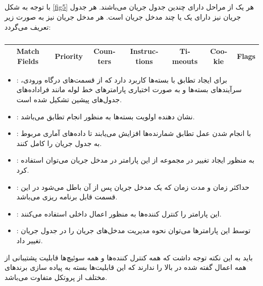 \subsection{}
با توجه به شکل \ref{fig5} هر یک از مراحل  دارای چندین جدول جریان می‌باشند. هر جدول جریان نیز دارای یک یا چند مدخل جریان است. هر مدخل جریان نیز به صورت زیر تعریف می‌گردد:
\begin{table}[ht]
	\centering
	\begin{latin}
		\begin{tabular}[t]{|c|c|c|c|c|c|c|}
			\hline
			Match Fields & Priority & Counters & Instructions & Timeouts & Cookie & Flags\\
			\hline
		\end{tabular}
	\end{latin}
	\caption{}
	\label{tab1}
\end{table}

\begin{itemize}
	\item {}:
برای ایجاد تطابق با بسته‌ها کاربرد دارد که از قسمت‌های درگاه ورودی، سرآیند‌های بسته‌ها و به صورت اختیاری پارامتر‌های خط لوله مانند فراداده‌های جدول‌های پیشین تشکیل شده است.
	\item {}:
نشان دهنده اولویت بسته‌ها به منظور انجام تطابق می‌باشد.
	\item {}:
با انجام شدن عمل تطابق شمارنده‌ها افزایش می‌یابند تا داده‌های آماری مربوط به جدول جریان را کامل کنند.
	\item {}:
به منظور ایجاد تغییر در مجموعه  از این پارامتر در مدخل جریان می‌توان استفاده کرد.
	\item {}:
حداکثر زمان و مدت زمان  که یک مدخل جریان پس از آن باطل می‌شود در این قسمت قابل برنامه ریزی می‌باشد.
	\item {}:
این پارامتر را کنترل کننده‌ها به منظور اعمال داخلی استفاده می‌کنند.
	\item {}:
توسط این پارامتر‌ها می‌توان نحوه مدیریت مدخل‌های جریان را در جدول جریان تغییر داد.
\end{itemize}

باید به این نکته توجه داشت که همه کنترل کننده‌ها و همه سوئیچ‌ها قابلیت پشتیبانی از همه اعمال گفته شده در بالا را ندارند که این قابلیت‌ها بسته به پیاده سازی برند‌های مختلف از پروتکل متفاوت می‌باشد.

